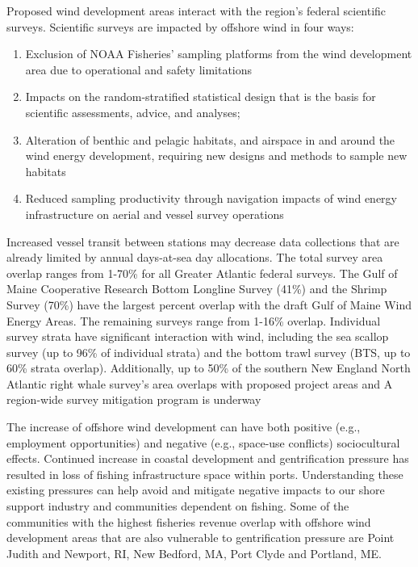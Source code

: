 \documentclass[
  10pt,
]{article}
\providecommand{\tightlist}{%
  \setlength{\itemsep}{0pt}\setlength{\parskip}{0pt}}
\begin{document}
Proposed wind development areas interact with the region's federal scientific surveys. Scientific surveys are impacted by offshore wind in four ways:

\begin{enumerate}
\def\labelenumi{\arabic{enumi}.}
\tightlist
\item
  Exclusion of NOAA Fisheries' sampling platforms from the wind development area due to operational and safety limitations
\item
  Impacts on the random-stratified statistical design that is the basis for scientific assessments, advice, and analyses;
\item
  Alteration of benthic and pelagic habitats, and airspace in and around the wind energy development, requiring new designs and methods to sample new habitats
\item
  Reduced sampling productivity through navigation impacts of wind energy infrastructure on aerial and vessel survey operations
\end{enumerate}

Increased vessel transit between stations may decrease data collections that are already limited by annual days-at-sea day allocations. The total survey area overlap ranges from 1-70\% for all Greater Atlantic federal surveys. The Gulf of Maine Cooperative Research Bottom Longline Survey (41\%) and the Shrimp Survey (70\%) have the largest percent overlap with the draft Gulf of Maine Wind Energy Areas. The remaining surveys range from 1-16\% overlap. Individual survey strata have significant interaction with wind, including the sea scallop survey (up to 96\% of individual strata) and the bottom trawl survey (BTS, up to 60\% strata overlap). Additionally, up to 50\% of the southern New England North Atlantic right whale survey's area overlaps with proposed project areas and A region-wide survey mitigation program is underway

The increase of offshore wind development can have both positive (e.g., employment opportunities) and negative (e.g., space-use conflicts) sociocultural effects. Continued increase in coastal development and gentrification pressure has resulted in loss of fishing infrastructure space within ports. Understanding these existing pressures can help avoid and mitigate negative impacts to our shore support industry and communities dependent on fishing. Some of the communities with the highest fisheries revenue overlap with offshore wind development areas that are also vulnerable to gentrification pressure are Point Judith and Newport, RI, New Bedford, MA, Port Clyde and Portland, ME.
\end{document}
